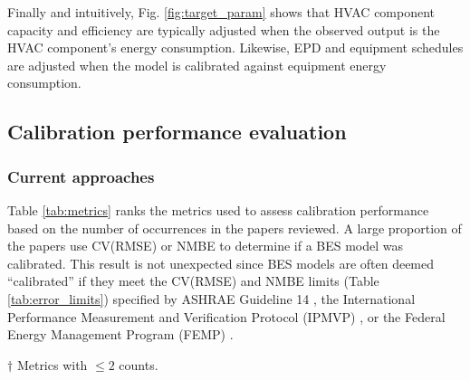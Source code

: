 \documentclass[review]{elsarticle}
\begin{document}
Finally and intuitively, Fig. \ref{fig:target_param} shows that HVAC component capacity and efficiency are typically adjusted when the observed output is the HVAC component's energy consumption. Likewise, EPD and equipment schedules are adjusted when the model is calibrated against equipment energy consumption. 

\subsection{Calibration performance evaluation}

\subsubsection{Current approaches} \label{sec:performance_current}

Table \ref{tab:metrics} ranks the metrics used to assess calibration performance based on the number of occurrences in the papers reviewed. A large proportion of the papers use CV(RMSE) or NMBE to determine if a BES model was calibrated. This result is not unexpected since BES models are often deemed ``calibrated'' if they meet the CV(RMSE) and NMBE limits (Table \ref{tab:error_limits}) specified by ASHRAE Guideline 14 \cite{ashrae2014guideline}, the International Performance Measurement and Verification Protocol (IPMVP) \cite{evo2012international}, or the Federal Energy Management Program (FEMP) \cite{femp2015guidelines}.

\begin{table}[h!]
\caption{Metrics used for the evaluation of calibration performance. Each paper may employ more than a one metric when assessing calibration performance. Therefore, the cummulative sum for the column ``No. of Papers'' is greater than the total number of papers reviewed (N=107).} 
\label{tab:metrics}
\centering
{}
\raggedright \tiny $\dagger$ Metrics with $\leq 2$ counts. 
\end{table}
\end{document}
